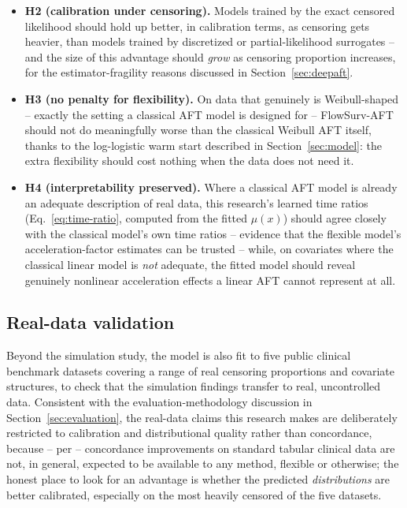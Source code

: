 \documentclass[11pt]{article}
\begin{document}
\begin{itemize}
    the original blanket hypothesis. This is, if anything, a more useful
    scientific answer than a clean sweep would have been: it says
    precisely \emph{which} kinds of hazard-generating mechanisms an
    AFT-shaped flow model helps with, and which ones still call for a
    different modelling approach altogether.
  \item \textbf{H2 (calibration under censoring).} Models trained by the
    exact censored likelihood should hold up better, in calibration
    terms, as censoring gets heavier, than models trained by discretized
    or partial-likelihood surrogates -- and the size of this advantage
    should \emph{grow} as censoring proportion increases, for the
    estimator-fragility reasons discussed in Section~\ref{sec:deepaft}.
  \item \textbf{H3 (no penalty for flexibility).} On data that genuinely
    is Weibull-shaped -- exactly the setting a classical AFT model is
    designed for -- FlowSurv-AFT should not do meaningfully worse than
    the classical Weibull AFT itself, thanks to the log-logistic warm
    start described in Section~\ref{sec:model}: the extra flexibility
    should cost nothing when the data does not need it.
  \item \textbf{H4 (interpretability preserved).} Where a classical AFT
    model is already an adequate description of real data, this
    research's learned time ratios (Eq.~\eqref{eq:time-ratio}, computed
    from the fitted $\mu(x)$) should agree closely with the classical
    model's own time ratios -- evidence that the flexible model's
    acceleration-factor estimates can be trusted -- while, on covariates
    where the classical linear model is \emph{not} adequate, the fitted
    model should reveal genuinely nonlinear acceleration effects a
    linear AFT cannot represent at all.
\end{itemize}

\subsection{Real-data validation}
Beyond the simulation study, the model is also fit to five public
clinical benchmark datasets covering a range of real censoring
proportions and covariate structures, to check that the simulation
findings transfer to real, uncontrolled data. Consistent with the
evaluation-methodology discussion in Section~\ref{sec:evaluation}, the
real-data claims this research makes are deliberately restricted to
calibration and distributional quality rather than concordance,
because -- per \citet{burk2024neutral} -- concordance improvements on
standard tabular clinical data are not, in general, expected to be
available to any method, flexible or otherwise; the honest place to look
for an advantage is whether the predicted \emph{distributions} are
better calibrated, especially on the most heavily censored of the five
datasets.
\end{document}
